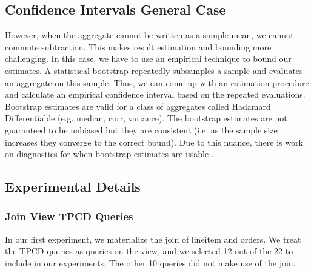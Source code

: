 \subsection{Confidence Intervals General Case}
However, when the aggregate cannot be written as a sample mean, we cannot commute subtraction.
This makes result estimation and bounding more challenging.
In this case, we have to use an empirical technique to bound our estimates.
A statistical bootstrap repeatedly subsamples a sample and evaluates an aggregate on this sample.
Thus, we can come up with an estimation procedure and calculate an empirical confidence interval based on the repeated evaluations.
Bootstrap estimates are valid for a class of aggregates called Hadamard Differentiable (e.g. median, corr, variance).
The bootstrap estimates are not guaranteed to be unbiased but they are consistent (i.e. as the sample size increases they converge to the correct bound).
Due to this nuance, there is work on diagnostics for when bootstrap estimates are usable \cite{agarwalknowing}.

\subsection{Experimental Details}

\subsubsection{Join View TPCD Queries}
In our first experiment, we materialize the join of lineitem and orders.
We treat the TPCD queries as queries on the view, and we selected 12 out of the 22 to include in our experiments.
The other 10 queries did not make use of the join.

